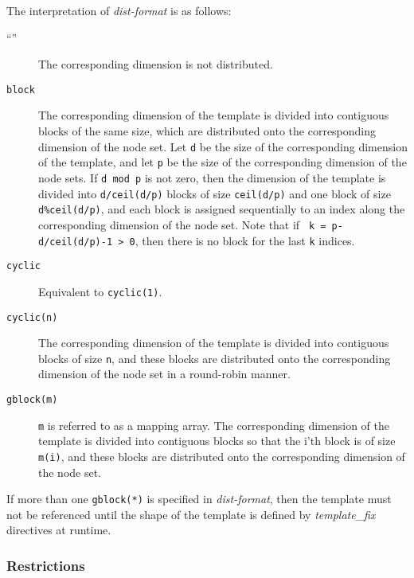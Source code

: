 The interpretation of {\it dist-format} is as follows:

\begin{description}
\item[``{\tt *}'']
	   The corresponding dimension is not distributed.

\item[{\tt block}]
	   The corresponding dimension of the template is divided into
	   contiguous blocks of the same size, which are distributed onto
	   the corresponding dimension of the node set. Let {\tt d} be
	   the size of the corresponding dimension of the template, and
	   let {\tt p} be the size of the corresponding dimension of the
	   node sets. If {\tt d mod p} is not zero, then the dimension
	   of the template is divided into {\tt d/ceil(d/p)} blocks of
	   size {\tt ceil(d/p)} and one block of size {\tt d\%ceil(d/p)},
	   and each block is assigned sequentially to an index along the
	   corresponding dimension of the node set. Note that if {\tt
	   k = p-d/ceil(d/p)-1 > 0}, then there is no block for the last
	   {\tt k} indices.

\item[{\tt cyclic}]
	   Equivalent to {\tt cyclic(1)}.

\item[{\tt cyclic(n)}]
	   The corresponding dimension of the template is divided into
	   contiguous blocks of size {\tt n}, and these blocks are
	   distributed onto the corresponding dimension of the node set
	   in a round-robin manner.

\item[{\tt gblock(m)}]
	   {\tt m} is referred to as a mapping array. The corresponding
	   dimension of the template is divided into contiguous
	   blocks so that the i'th block is of size {\tt m(i)}, and
	   these blocks are distributed onto the corresponding dimension
	   of the node set.
\end{description}

If more than one {\tt gblock(*)} is specified in {\it dist-format},
then the template must not be referenced until the shape of the template
is defined by {\it template\_fix} directives at runtime.


\subsubsection*{Restrictions}

